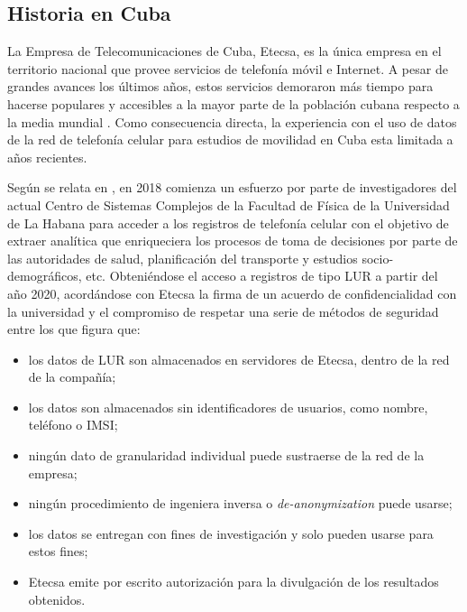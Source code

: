 
\subsection*{Historia en Cuba}

La Empresa de Telecomunicaciones de Cuba, Etecsa, es la única empresa en el territorio nacional que provee servicios de telefonía móvil e Internet. A pesar de grandes avances los últimos años, estos servicios demoraron más tiempo para hacerse populares y accesibles a la mayor parte de la población cubana respecto a la media mundial \cite{durive2021sistema}. Como consecuencia directa, la experiencia con el uso de datos de la red de telefonía celular para estudios de movilidad en Cuba esta limitada a años recientes.

Según se relata en \cite{durive2021sistema}, en 2018 comienza un esfuerzo por parte de investigadores del actual Centro de Sistemas Complejos de la Facultad de Física de la Universidad de La Habana para acceder a los registros de telefonía celular con el objetivo de extraer analítica que enriqueciera los procesos de toma de decisiones por parte de las autoridades de salud, planificación del transporte y estudios socio-demográficos, etc. Obteniéndose el acceso a registros de tipo LUR a partir del año 2020, acordándose con Etecsa la firma de un acuerdo de confidencialidad con la universidad y el compromiso de respetar una serie de métodos de seguridad entre los que figura que:

\begin{itemize}
    \item los datos de LUR son almacenados en servidores de Etecsa, dentro de la red de la compañía;
    \item los datos son almacenados sin identificadores de usuarios, como nombre, teléfono o IMSI;
    \item ningún dato de granularidad individual puede sustraerse de la red de la empresa;
    \item ningún procedimiento de ingeniera inversa o \textit{de-anonymization} puede usarse;
    \item los datos se entregan con fines de investigación y solo pueden usarse para estos fines;
    \item Etecsa emite por escrito autorización para la divulgación de los resultados obtenidos.
\end{itemize}

